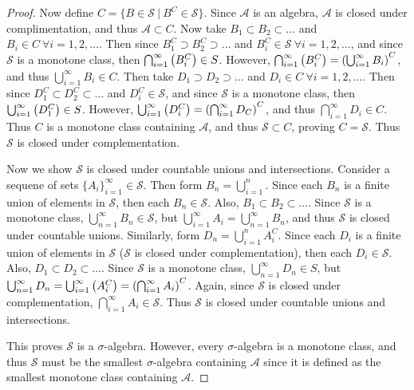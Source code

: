 \documentclass[12pt]{article}
\theoremstyle{plain}
\begin{document}
\begin{proof}
    Now define $C = \{B \in \mathcal{S}\ |\ B^C \in \mathcal{S}\}$.  Since $\mathcal{A}$ is an algebra, $\mathcal{A}$ is closed under complimentation, and thus $\mathcal{A} \subset C$.  Now take $B_1 \subset B_2 \subset \dots$ and $B_i \in C\ \forall i = 1, 2, \dots$.  Then since $B_1^C \supset B_2^C \supset \dots$ and $B_i^C \in \mathcal{S}\ \forall i = 1, 2, \dots$, and since $\mathcal{S}$ is a monotone class, then $\bigcap_{i=1}^\infty \qty(B_i^C) \in S$.  However, $\bigcap_{i=1}^\infty \qty(B_i^C) = \qty(\bigcup_{i=1}^\infty B_i)^C$, and thus $\bigcup_{i=1}^\infty B_i \in C$.  Then take $D_1 \supset D_2 \supset \dots$ and $D_i \in C\ \forall i = 1, 2, \dots$.  Then since $D_1^C \subset D_2^C \subset \dots$ and $D_i^C \in \mathcal{S}$, and since $\mathcal{S}$ is a monotone class, then $\bigcup_{i=1}^\infty \qty(D_1^C) \in S$.  However, $\bigcup_{i=1}^\infty \qty(D_i^C) = \qty(\bigcap_{i=1}^\infty D_C)^C$, and thus $\bigcap_{i=1}^\infty D_i \in C$.  Thus $C$ is a monotone class containing $\mathcal{A}$, and thus $\mathcal{S} \subset C$, proving $C = \mathcal{S}$.  Thus $\mathcal{S}$ is closed under complementation.

    Now we show $\mathcal{S}$ is closed under countable unions and intersections.  Consider a sequene of sets $\{A_i\}_{i=1}^\infty \in \mathcal{S}$.  Then form $B_n = \bigcup_{i=1}^n$.  Since each $B_n$ is a finite union of elements in $\mathcal{S}$, then each $B_n \in \mathcal{S}$.  Also, $B_1 \subset B_2 \subset \dots$.  Since $\mathcal{S}$ is a monotone class, $\bigcup_{n=1}^\infty B_n \in \mathcal{S}$, but $\bigcup_{i=1}^\infty A_i = \bigcup_{n=1}^\infty B_n$, and thus $\mathcal{S}$ is closed under countable unions.  Similarly, form $D_n = \bigcup_{i=1}^n A_i^C$.  Since each $D_i$ is a finite union of elements in $\mathcal{S}$ ($\mathcal{S}$ is closed under complementation), then each $D_i \in \mathcal{S}$.  Also, $D_1 \subset D_2 \subset \dots$.  Since $\mathcal{S}$ is a monotone class, $\bigcup_{n=1}^\infty D_n \in S$, but $\bigcup_{n=1}^\infty D_n = \bigcup_{i=1}^\infty \qty(A_i^C) = \qty(\bigcap_{i=1}^\infty A_i)^C$.  Again, since $\mathcal{S}$ is closed under complementation, $\bigcap_{i=1}^\infty A_i \in \mathcal{S}$.  Thus $\mathcal{S}$ is closed under countable unions and intersections.

    This proves $\mathcal{S}$ is a $\sigma$-algebra.  However, every $\sigma$-algebra is a monotone class, and thus $\mathcal{S}$ must be the smallest $\sigma$-algebra containing $\mathcal{A}$ since it is defined as the smallest monotone class containing $\mathcal{A}$.
\end{proof}
\end{document}
